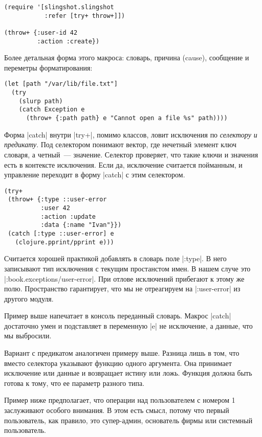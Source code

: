 \begin{verbatim}
(require '[slingshot.slingshot
           :refer [try+ throw+]])

(throw+ {:user-id 42
         :action :create})
\end{verbatim}

Более детальная форма этого макроса: словарь, причина (cause), сообщение и
переметры форматирования:

\begin{verbatim}
(let [path "/var/lib/file.txt"]
  (try
    (slurp path)
    (catch Exception e
      (throw+ {:path path} e "Cannot open a file %s" path))))
\end{verbatim}

Форма \spverb|catch| внутри \spverb|try+|, помимо классов, ловит исключения по \emph{селектору и
предикату}. Под селектором понимают вектор, где нечетный элемент ключ словаря,
а четный~--- значение. Селектор проверяет, что такие ключи и значения есть в
контексте исключения. Если да, исключение считается пойманным, и управление
переходит в форму \spverb|catch| с этим селектором.

\begin{verbatim}
(try+
 (throw+ {:type ::user-error
          :user 42
          :action :update
          :data {:name "Ivan"}})
 (catch [:type ::user-error] e
   (clojure.pprint/pprint e)))
\end{verbatim}

Считается хорошей практикой добавлять в словарь поле \spverb|:type|. В него записывают
тип исключения с текущим простанстом имен. В нашем случе это
\spverb|:book.exceptions/user-error|. При отлове исключений прибегают к этому же
полю. Пространство гарантирует, что мы не отреагируем на \spverb|:user-error| из
другого модуля.

Пример выше напечатает в консоль переданный словарь. Макрос \spverb|catch| достаточно
умен и подставляет в переменную \spverb|e| не исключение, а данные, что мы выбросили.

Вариант с предикатом аналогичен примеру выше. Разница лишь в том, что вместо
селектора указывают функцию одного аргумента. Она принимает исключение или
данные и возвращает истину или ложь. Функция должна быть готова к тому, что ее
параметр разного типа.

Пример ниже предполагает, что операции над пользователем с номером 1 заслуживают
особого внимания. В этом есть смысл, потому что первый пользователь, как
правило, это супер-админ, основатель фирмы или системный пользователь.

